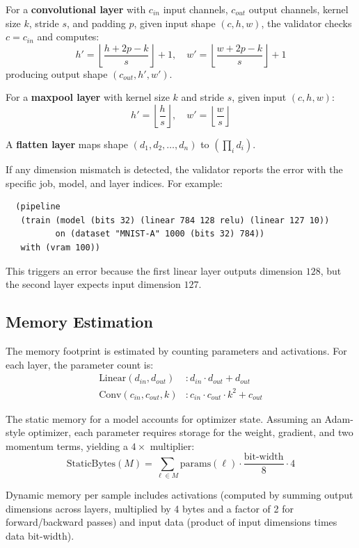 \documentclass{nfr}
\begin{document}
For a \textbf{convolutional layer} with $c_{in}$ input channels, $c_{out}$ output channels, kernel size $k$, stride $s$, and padding $p$, given input shape $(c, h, w)$, the validator checks $c = c_{in}$ and computes:
\[
h' = \left\lfloor \frac{h + 2p - k}{s} \right\rfloor + 1, \quad w' = \left\lfloor \frac{w + 2p - k}{s} \right\rfloor + 1
\]
producing output shape $(c_{out}, h', w')$.

For a \textbf{maxpool layer} with kernel size $k$ and stride $s$, given input $(c, h, w)$:
\[
h' = \left\lfloor \frac{h}{s} \right\rfloor, \quad w' = \left\lfloor \frac{w}{s} \right\rfloor
\]

A \textbf{flatten layer} maps shape $(d_1, d_2, \ldots, d_n)$ to $(\prod_i d_i)$.

If any dimension mismatch is detected, the validator reports the error with the specific job, model, and layer indices. For example:

\lstset{language=lisp}
\begin{lstlisting}
  (pipeline
   (train (model (bits 32) (linear 784 128 relu) (linear 127 10)) 
          on (dataset "MNIST-A" 1000 (bits 32) 784))
   with (vram 100))
\end{lstlisting}

This triggers an error because the first linear layer outputs dimension $128$, but the second layer expects input dimension $127$.

\subsection{Memory Estimation}
The memory footprint is estimated by counting parameters and activations. For each layer, the parameter count is:
\begin{align*}
    \text{Linear}(d_{in}, d_{out}) &: d_{in} \cdot d_{out} + d_{out} \\
    \text{Conv}(c_{in}, c_{out}, k) &: c_{in} \cdot c_{out} \cdot k^2 + c_{out}
\end{align*}

The static memory for a model accounts for optimizer state. Assuming an Adam-style optimizer, each parameter requires storage for the weight, gradient, and two momentum terms, yielding a $4\times$ multiplier:
\[
\text{StaticBytes}(M) = \sum_{\ell \in M} \text{params}(\ell) \cdot \frac{\text{bit-width}}{8} \cdot 4
\]

Dynamic memory per sample includes activations (computed by summing output dimensions across layers, multiplied by 4 bytes and a factor of 2 for forward/backward passes) and input data (product of input dimensions times data bit-width).
\end{document}
